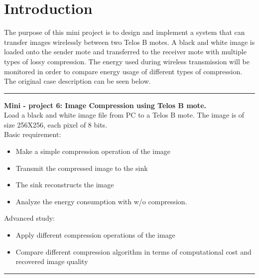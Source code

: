 \section{Introduction}
The purpose of this mini project is to design and implement a system that can transfer images wirelessly between two Telos B motes. A black and white image is loaded onto the sender mote and transferred to the receiver mote with multiple types of lossy compression. The energy used during wireless transmission will be monitored in order to compare energy usage of different types  of compression. The original case description can be seen below.
\begin{center}
\noindent\rule{4cm}{0.4pt}
\end{center}
\textbf{Mini - project 6: Image Compression using Telos B mote.}\\
Load a black and white image file from PC to a Telos B mote. The image is of size 256X256, each pixel of 8 bits.\\
Basic requirement:
\vspace{-15pt}
\begin{itemize}
\item Make a simple compression operation of the image
\item Transmit the compressed image to the sink
\item The sink reconstructs the image
\item Analyze the energy consumption with w/o compression. 
\end{itemize}
Advanced study:
\vspace{-15pt}
\begin{itemize}
\item Apply different compression operations of the image
\item Compare different compression algorithm in terms of computational cost and recovered image quality
\end{itemize}
\begin{center}
\noindent\rule{4cm}{0.4pt}
\end{center}

